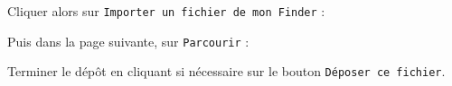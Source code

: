 
Cliquer alors sur \texttt{Importer un fichier de mon Finder} :


Puis dans la page suivante, sur \texttt{Parcourir} :



Terminer le dépôt en cliquant si nécessaire sur le bouton \texttt{Déposer ce fichier}.












 

